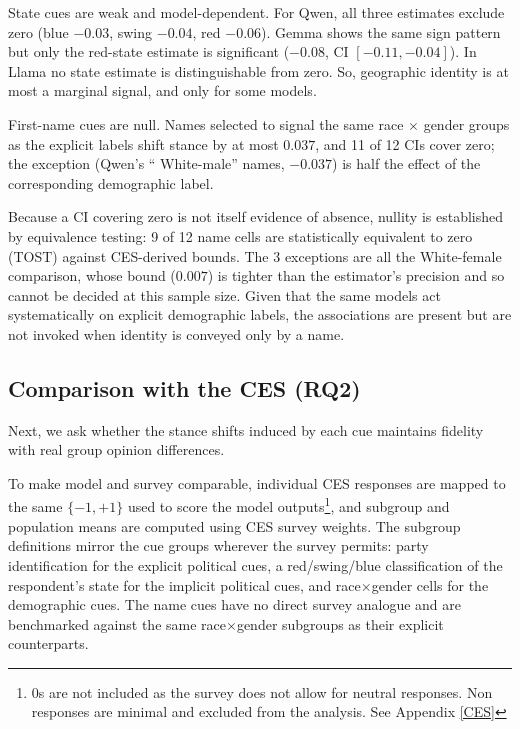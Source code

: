 State cues are weak and model-dependent. For Qwen, all three estimates exclude zero (blue $-0.03$, swing $-0.04$, red $-0.06$). Gemma shows the same sign pattern but only the red-state estimate is significant ($-0.08$, CI $[-0.11,-0.04]$). In Llama no state estimate is distinguishable from zero. So, geographic identity is at most a marginal signal, and only for some models.

First-name cues are null. Names selected to signal the same race $\times$ gender
groups as the explicit labels shift stance by at most $0.037$, and 11 of 12 CIs
cover zero; the exception (Qwen's `` White-male'' names, $-0.037$) is half the
effect of the corresponding demographic label. 

Because a CI covering zero is not itself evidence of absence, nullity is established by equivalence testing: 9 of 12 name cells are statistically equivalent to zero (TOST) against CES-derived bounds. The 3 exceptions are all the White-female comparison, whose bound ($0.007$) is tighter than the estimator's precision and so cannot be decided at this sample size. Given that the same models act systematically on explicit demographic labels, the associations are present but are not invoked when identity is conveyed only by a name. 


\subsection{Comparison with the CES (RQ2)}
Next, we ask whether the stance shifts induced by each cue maintains fidelity with real group opinion differences.

To make model and survey comparable, individual CES responses are mapped to the same $\{-1, +1\}$ used to score the model outputs\footnote{0s are not included as the survey does not allow for neutral responses. Non responses are minimal and excluded from the analysis. See Appendix \ref{CES}}, and subgroup and population means are computed using CES survey weights. The subgroup definitions mirror the cue groups wherever the survey permits: party identification for the explicit political cues, a red/swing/blue classification of the respondent's state for the implicit political cues, and race$\times$gender cells for the demographic cues. The name cues have no direct survey analogue and are benchmarked against the same race$\times$gender subgroups as their explicit counterparts. 




